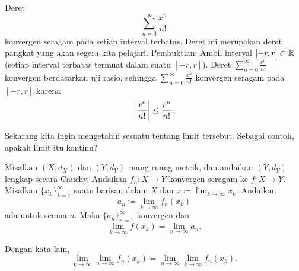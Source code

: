 \begin{example}
Deret
\begin{equation*}
\sum_{n=0}^\infty \frac{x^n}{n!} 
\end{equation*}
konvergen seragam pada setiap interval terbatas.
Deret ini merupakan deret pangkat yang akan segera kita pelajari.
Pembuktian: Ambil interval $[-r,r] \subset {\mathbb{R}}$ (setiap interval terbatas
termuat dalam suatu $[-r,r]$).
Deret $\sum_{n=0}^\infty \frac{r^n}{n!}$ konvergen berdasarkan uji rasio,
sehingga $\sum_{n=0}^\infty \frac{x^n}{n!}$ konvergen seragam pada $[-r,r]$ karena
\begin{equation*}
\left\lvert {\frac{x^n}{n!} } \right\rvert \leq 
\frac{r^n}{n!} .
\end{equation*}
\end{example}

Sekarang kita ingin mengetahui sesuatu tentang limit tersebut. Sebagai contoh,
apakah limit itu kontinu?


\begin{prop} \label{prop:uniformswitch}
Misalkan $(X,d_X)$ dan $(Y,d_Y)$ ruang-ruang metrik, dan andaikan $(Y,d_Y)$
lengkap secara Cauchy.
Andaikan $f_n \colon X \to Y$ konvergen seragam ke
 $f \colon X \to Y$.
Misalkan $\{ x_k \}_{k=1}^\infty$ suatu barisan dalam $X$ dan $x \coloneqq \lim_{k \to \infty} x_k$. Andaikan
\begin{equation*}
a_n \coloneqq \lim_{k \to \infty} f_n(x_k)
\end{equation*}
ada untuk semua $n$. Maka
$\{a_n\}_{n=1}^\infty$ konvergen dan
\begin{equation*}
\lim_{k \to \infty} f(x_k) = \lim_{n\to\infty} a_n .
\end{equation*}
\end{prop}

Dengan kata lain,
\begin{equation*}
\lim_{k \to \infty} \lim_{n\to\infty} f_n(x_k) =
\lim_{n \to \infty} \lim_{k\to\infty} f_n(x_k) .
\end{equation*}

